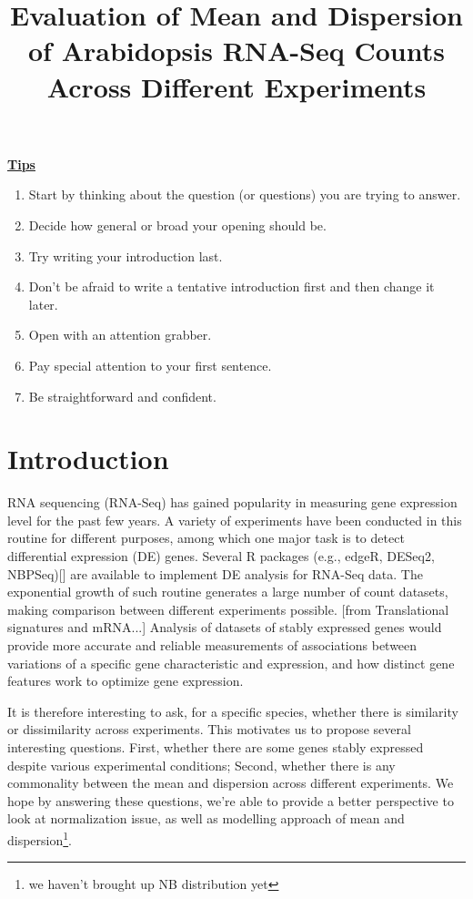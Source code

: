 \documentclass[paper=a4, fontsize=12.5pt]{scrartcl} %
\title{Evaluation of Mean and Dispersion of Arabidopsis RNA-Seq Counts Across Different Experiments}
\date{} %
\numberwithin{equation}{section} %
\numberwithin{figure}{section} %
\numberwithin{table}{section} %
\begin{document}
\maketitle

\textbf{\href{http://writingcenter.unc.edu/handouts/introductions/}{Tips}}
\begin{enumerate}
\item Start by thinking about the question (or questions) you are trying to answer.
\item Decide how general or broad your opening should be.
\item Try writing your introduction last.
\item Don't be afraid to write a tentative introduction first and then change it later.
\item Open with an attention grabber. 
\item Pay special attention to your first sentence. 
\item Be straightforward and confident.
\end{enumerate}

\section{Introduction}
RNA sequencing (RNA-Seq) has gained {} popularity in measuring gene  expression level for the past few years. A variety of experiments  have been conducted in this routine for {} different purposes, among which one major task is to detect differential expression (DE) genes. Several R packages (e.g., edgeR, DESeq2, NBPSeq)[{\color{green}{reference needed}}] are available to implement DE analysis for RNA-Seq data. The exponential growth of such routine generates a large number of count datasets, making comparison between different experiments possible. 
[from Translational signatures and mRNA...]
Analysis of datasets of stably expressed genes would provide more accurate and reliable measurements of associations between variations of a specific gene characteristic and expression, and how distinct gene features work to optimize gene expression.

It is therefore interesting to ask, for a specific species, whether there is similarity or dissimilarity across experiments. This motivates us to propose several interesting questions. First, whether there are some genes stably expressed despite various experimental conditions; Second, whether there is any commonality between the mean and dispersion across different experiments. We hope by answering these questions, we're able to provide a better perspective to look at normalization issue, as well as modelling approach of mean and dispersion\footnote{we haven't brought up NB distribution yet}. \\
\end{document}
